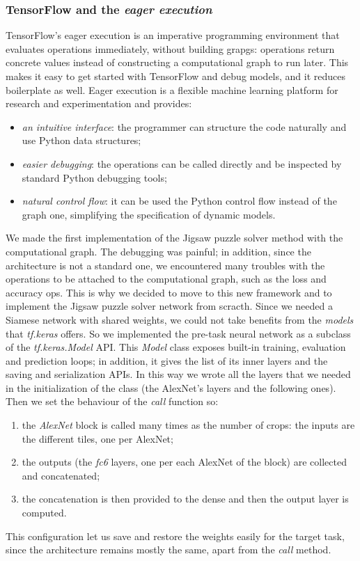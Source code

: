 \subsubsection{TensorFlow and the \emph{eager execution}}
TensorFlow's eager execution \cite{tf_eager} is an imperative programming environment that evaluates operations immediately, without building grapgs: operations return concrete values instead of constructing a computational graph to run later. This makes it easy to get started with TensorFlow and debug models, and it reduces boilerplate as well. Eager execution is a flexible machine learning platform for research and experimentation and provides:
\begin{itemize}
    \item \textit{an intuitive interface}: the programmer can structure the code naturally and use Python data structures;
    \item \textit{easier debugging}: the operations can be called directly and be inspected by standard Python debugging tools;
    \item \textit{natural control flow}: it can be used the Python control flow instead of the graph one, simplifying the specification of dynamic models.
\end{itemize}
We made the first implementation of the Jigsaw puzzle solver method with the computational graph. The debugging was painful; in addition, since the architecture is not a standard one, we encountered many troubles with the operations to be attached to the computational graph, such as the loss and accuracy ops. This is why we decided to move to this new framework and to implement the Jigsaw puzzle solver network from scracth.\newline
Since we needed a Siamese network with shared weights, we could not take benefits from the \emph{models} that \emph{tf.keras} offers. So we implemented the pre-task neural network as a subclass of the \emph{tf.keras.Model} API. This \emph{Model} class exposes built-in training, evaluation and prediction loops; in addition, it gives the list of its inner layers and the saving and serialization APIs. In this way we wrote all the layers that we needed in the initialization of the class (the AlexNet's layers and the following ones). Then we set the behaviour of the \emph{call} function so:
\begin{enumerate}
    \item the \emph{AlexNet} block is called many times as the number of crops: the inputs are the different tiles, one per AlexNet;
    \item the outputs (the \textit{fc6} layers, one per each AlexNet of the block) are collected and concatenated;
    \item the concatenation is then provided to the dense and then the output layer is computed.
\end{enumerate}
This configuration let us save and restore the weights easily for the target task, since the architecture remains mostly the same, apart from the \emph{call} method.

